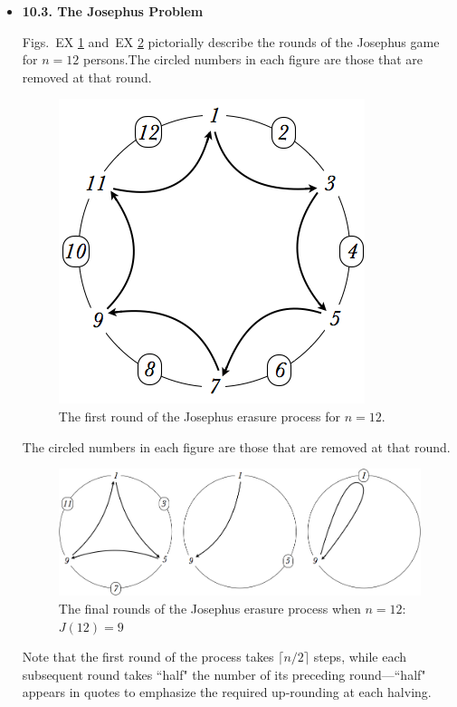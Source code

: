 \begin{itemize}
\item
{\bf 10.3. The Josephus Problem}
\medskip

Figs.~EX \ref{fig:josephus12step1} and~EX \ref{fig:josephus12step2} pictorially describe the rounds of the Josephus game for $n=12$ persons.The circled numbers in each figure are those that are removed at that round.
\begin{figure}[ht]
\begin{center}
        \includegraphics[scale=0.3]{FiguresMaths/josephus12step1}
\caption{The first round of the Josephus erasure process for $n=12$.}
        \label{fig:josephus12step1} 
\end{center}
\end{figure}
The circled numbers in each figure are those that are removed at that round.
\begin{figure}[ht]
\begin{center}
        \includegraphics[scale=0.3]{FiguresMaths/josephus12LastSteps}
        \caption{The final rounds of the Josephus erasure process when $n=12$: \ $J(12) = 9$}
        \label{fig:josephus12step2}
\end{center}
\end{figure}
Note that the first round of the process takes $\lceil n/2 \rceil$ steps, while each subsequent round takes ``half" the number of its preceding round---``half" appears in quotes to emphasize the required up-rounding at each halving.


\end{itemize}
